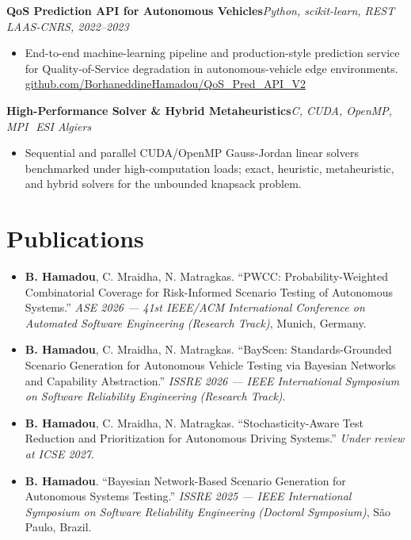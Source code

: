 \documentclass[a4paper,10pt]{article}
\newcommand{\cvproject}[2]{%
  \vspace{3pt}%
  \begingroup\parfillskip=0pt\relax
    \textbf{#1}\hfill \textit{#2}\par
  \endgroup
  \vspace{1pt}%
}
\newcommand{\cvdot}{\,\textperiodcentered\,}
\begin{document}
\cvproject{QoS Prediction API for Autonomous Vehicles}{Python, scikit-learn, REST \cvdot LAAS-CNRS, 2022--2023}
\begin{itemize}
  \item End-to-end machine-learning pipeline and production-style prediction service for Quality-of-Service degradation in autonomous-vehicle edge environments. \href{https://github.com/BorhaneddineHamadou/QoS_Pred_API_V2}{github.com/BorhaneddineHamadou/QoS\_Pred\_API\_V2}
\end{itemize}

\cvproject{High-Performance Solver \& Hybrid Metaheuristics}{C, CUDA, OpenMP, MPI \cvdot ESI Algiers}
\begin{itemize}
  \item Sequential and parallel CUDA/OpenMP Gauss-Jordan linear solvers benchmarked under high-computation loads; exact, heuristic, metaheuristic, and hybrid solvers for the unbounded knapsack problem.
\end{itemize}


\section*{Publications}

\begin{itemize}
  \item \textbf{B. Hamadou}, C. Mraidha, N. Matragkas. ``PWCC: Probability-Weighted Combinatorial Coverage for Risk-Informed Scenario Testing of Autonomous Systems.'' \emph{ASE 2026 --- 41st IEEE/ACM International Conference on Automated Software Engineering (Research Track)}, Munich, Germany.
  \item \textbf{B. Hamadou}, C. Mraidha, N. Matragkas. ``BayScen: Standards-Grounded Scenario Generation for Autonomous Vehicle Testing via Bayesian Networks and Capability Abstraction.'' \emph{ISSRE 2026 --- IEEE International Symposium on Software Reliability Engineering (Research Track)}.
  \item \textbf{B. Hamadou}, C. Mraidha, N. Matragkas. ``Stochasticity-Aware Test Reduction and Prioritization for Autonomous Driving Systems.'' \emph{Under review at ICSE 2027}.
  \item \textbf{B. Hamadou}. ``Bayesian Network-Based Scenario Generation for Autonomous Systems Testing.'' \emph{ISSRE 2025 --- IEEE International Symposium on Software Reliability Engineering (Doctoral Symposium)}, S\~ao Paulo, Brazil.
\end{itemize}
\end{document}
